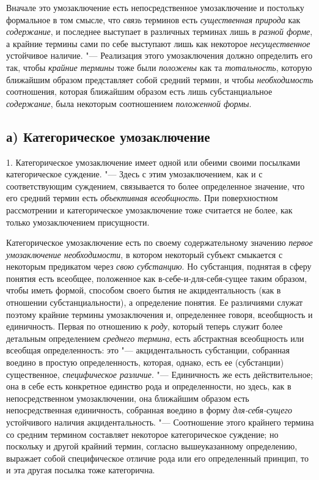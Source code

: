 Вначале это умозаключение есть непосредственное умозаключение
и постольку формальное в том смысле, что
{\em связь} терминов есть
{\em существенная природа}
как {\em содержание},
и последнее выступает в различных терминах лишь в
{\em разной форме}, а
крайние термины сами по себе выступают лишь как некоторое
{\em несущественное}
устойчивое наличие. "--- Реализация этого
умозаключения должно определить его так, чтобы
{\em крайние термины
}тоже были
{\em положены} как та
{\em тотальность},
которую ближайшим образом представляет собой средний термин,
и чтобы {\em необходимость}
соотношения, которая ближайшим образом есть лишь
субстанциальное {\em содержание},
была некоторым соотношением
{\em положенной формы}.

\subsection[а) Категорическое умозаключение]{а) Категорическое умозаключение}
1. Категорическое умозаключение имеет одной или обеими своими
посылками категорическое
суждение.
"--- Здесь с этим умозаключением, как и с соответствующим
суждением, связывается то более определенное значение, что
его средний термин есть {\em объективная
всеобщность}. При поверхностном рассмотрении и
категорическое умозаключение тоже считается не более, как только
умозаключением присущности.

Категорическое умозаключение есть по своему содержательному
значению {\em первое умозаключение
необходимости}, в котором некоторый субъект смыкается с
некоторым предикатом через {\em свою
субстанцию}. Но субстанция, поднятая в сферу понятия есть
всеобщее, положенное как в-себе-и-для-себя-сущее таким образом, чтобы иметь
формой, способом своего бытия не акцидентальность (как в отношении
субстанциальности), а определение понятия. Ее различиями служат поэтому
крайние термины умозаключения и, определеннее говоря, всеобщность и
единичность. Первая по отношению к
{\em роду}, который
теперь служит более детальным определением
{\em среднего термина},
есть абстрактная всеобщность или всеобщая определенность:
это "--- акцидентальность субстанции, собранная воедино в
простую определенность, которая, однако, есть ее (субстанции) существенное,
{\em специфическое различие}. "---
Единичность же есть действительное; она в себе есть
конкретное единство рода и определенности, но здесь, как в непосредственном
умозаключении, она ближайшим образом есть непосредственная единичность,
собранная воедино в форму
{\em для-себя-сущего}
устойчивого наличия акцидентальность. "---
Соотношение этого крайнего термина со средним термином
составляет некоторое категорическое суждение; но поскольку и другой крайний
термин, согласно вышеуказанному определению, выражает собой специфическое
отличие рода или его определенный принцип, то и эта другая посылка тоже
категорична.

